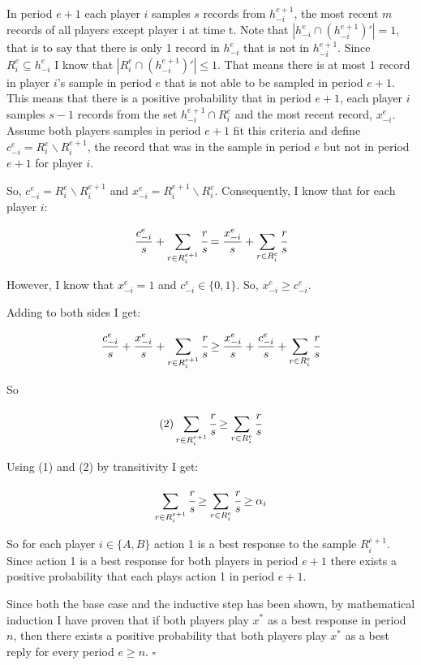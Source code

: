 \documentclass{article}
\begin{document}
\vskip6pt

In period $e+1$ each player $i$ samples $s$ records from $h_{-i}^{e+1}$, the most recent $m$
records of all players except player i at time t. Note that $|h_{-i}^{e} \cap (h_{-i}^{e+1})'|=1$, that is to say that there is only 1 record in $h_{-i}^{e}$ that is not in $h_{-i}^{e+1}$. Since $R_i^{e} \subseteq h_{-i}^{e}$ I know that $|R_i^{e} \cap (h_{-i}^{e+1})'| \leq 1$. That means there is at most 1 record in player $i$'s sample in period $e$ that is not able to be sampled in period $e+1$. This means that there is a positive probability that in period $e+1$, each player $i$ samples $s-1$ records from the set $h_{-i}^{e+1} \cap R_i^{e}$ and the most recent record, $x_{-i}^{e}$. Assume both players samples in period $e+1$ fit this criteria and define $c_{-i}^{e}=R_i^e \backslash R_i^{e+1}$, the record that was in the sample in period $e$ but not in period $e+1$ for player $i$.

\vskip6pt

So, $c_{-i}^{e}=R_i^e \backslash R_i^{e+1}$ and $x_{-i}^{e}=R_i^{e+1} \backslash R_i^{e}$. Consequently, I know that for each player $i$:

$$\frac{c_{-i}^{e}}{s} + \sum\limits_{r \in R_i^{e+1}} \cfrac{r}{s} = \frac{x_{-i}^{e}}{s} + \sum\limits_{r \in R_i^{e}} \cfrac{r}{s}$$

However, I know that $x_{-i}^{e}=1$ and $c_{-i}^{e} \in \{0,1\}$. So, $x_{-i}^{e} \geq c_{-i}^{e}$.

Adding to both sides I get:

$$\frac{c_{-i}^{e}}{s} + \frac{x_{-i}^{e}}{s} + \sum\limits_{r \in R_i^{e+1}} \cfrac{r}{s} \geq \frac{x_{-i}^{e}}{s} + \frac{c_{-i}^{e}}{s} + \sum\limits_{r \in R_i^{e}} \cfrac{r}{s}$$

So

$$(2) \sum\limits_{r \in R_i^{e+1}} \cfrac{r}{s} \geq \sum\limits_{r \in R_i^{e}} \cfrac{r}{s}$$

Using (1) and (2) by transitivity I get:

$$\sum\limits_{r \in R_i^{e+1}} \cfrac{r}{s} \geq \sum\limits_{r \in R_i^{e}} \cfrac{r}{s} \geq \alpha_i$$

So for each player $i \in \{A,B\}$ action 1 is a best response to the sample $R_i^{e+1}$. Since action 1 is a best response for both players in period $e+1$ there exists a positive probability that each plays action 1 in period $e+1$.

\vskip6pt

Since both the base case and the inductive step has been shown, by mathematical induction I have proven that if both players play $x^*$ as a best response in period $n$, then there exists a positive probability that both players play $x^*$ as a best reply for every period $e \geq n$. $\square$
\end{document}
